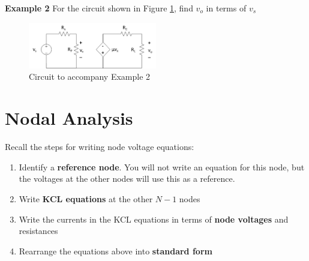 \documentclass{handout}
\begin{document}


\newpage
\clearpage
\pagebreak

\textbf{Example 2}
For the circuit shown in Figure \ref{fig: Example2}, find $v_o$ in terms of $v_s$

\begin{figure}[h! t! b!]
\centering
\includegraphics[width=0.5\textwidth]{Example2.jpg}
\caption{Circuit to accompany Example 2}
\label{fig: Example2}
\end{figure}



\newpage
\clearpage
\pagebreak

\section{Nodal Analysis}
Recall the steps for writing node voltage equations:
\begin{enumerate}
\item Identify a \textbf{reference node}.  You will not write an equation for this node, but the voltages at the other nodes will use this as a reference.
\item Write \textbf{KCL equations} at the other $N-1$ nodes
\item Write the currents in the KCL equations in terms of \textbf{node voltages} and resistances
\item Rearrange the equations above into \textbf{standard form}
\end{enumerate}
\end{document}
